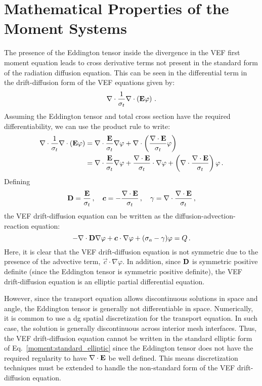 \documentclass[../doc.tex]{subfiles}
\begin{document}
\section{Mathematical Properties of the Moment Systems}
The presence of the Eddington tensor inside the divergence in the VEF first moment equation leads to cross derivative terms not present in the standard form of the radiation diffusion equation. This can be seen in the differential term in the drift-diffusion form of the VEF equations given by:
	\begin{equation}
		\nabla\cdot\frac{1}{\sigma_t}\nabla\cdot\left( \boldsymbol{\mathrm{E}}\varphi \right) \,. 
	\end{equation}
Assuming the Eddington tensor and total cross section have the required differentiability, we can use the product rule to write:
	\begin{equation}
	\begin{aligned}
		\nabla\cdot\frac{1}{\sigma_t}\nabla\cdot\left( \boldsymbol{\mathrm{E}}\varphi \right) &= \nabla\cdot\frac{\boldsymbol{\mathrm{E}}}{\sigma_t}\nabla\varphi + \nabla\cdot\left( \frac{\nabla\cdot\boldsymbol{\mathrm{E}}}{\sigma_t}\varphi \right) \\
		&= \nabla\cdot\frac{\boldsymbol{\mathrm{E}}}{\sigma_t}\nabla\varphi + \frac{\nabla\cdot\boldsymbol{\mathrm{E}}}{\sigma_t}\cdot\nabla\varphi + \left( \nabla\cdot\frac{\nabla\cdot\boldsymbol{\mathrm{E}}}{\sigma_t} \right) \varphi \,. 
	\end{aligned}
	\end{equation}
Defining 
	\begin{equation}
		\boldsymbol{\mathrm{D}} = \frac{\boldsymbol{\mathrm{E}}}{\sigma_t}\,,\quad \boldsymbol{c} = -\frac{\nabla\cdot\boldsymbol{\mathrm{E}}}{\sigma_t}\,, \quad \gamma = \nabla\cdot\frac{\nabla\cdot\boldsymbol{\mathrm{E}}}{\sigma_t} \,,
	\end{equation}
the VEF drift-diffusion equation can be written as the diffusion-advection-reaction equation: 
	\begin{equation} \label{moment:standard_elliptic}
		-\nabla\cdot\boldsymbol{\mathrm{D}}\nabla\varphi + \boldsymbol{c}\cdot\nabla\varphi + (\sigma_a - \gamma) \varphi = Q \,. 
	\end{equation}
Here, it is clear that the VEF drift-diffusion equation is not symmetric due to the presence of the advective term, $\vec{c}\cdot\nabla\varphi$. In addition, since $\boldsymbol{\mathrm{D}}$ is symmetric positive definite (since the Eddington tensor is symmetric positive definite), the VEF drift-diffusion equation is an elliptic partial differential equation. 

However, since the transport equation allows discontinuous solutions in space and angle, the Eddington tensor is generally not differentiable in space. Numerically, it is common to use a \gls{dg} spatial discretization for the transport equation. In such case, the solution is generally discontinuous across interior mesh interfaces. Thus, the VEF drift-diffusion equation cannot be written in the standard elliptic form of Eq.~\ref{moment:standard_elliptic} since the Eddington tensor does not have the required regularity to have $\nabla\cdot\boldsymbol{\mathrm{E}}$ be well defined. This means discretization techniques must be extended to handle the non-standard form of the VEF drift-diffusion equation. 
\end{document}
